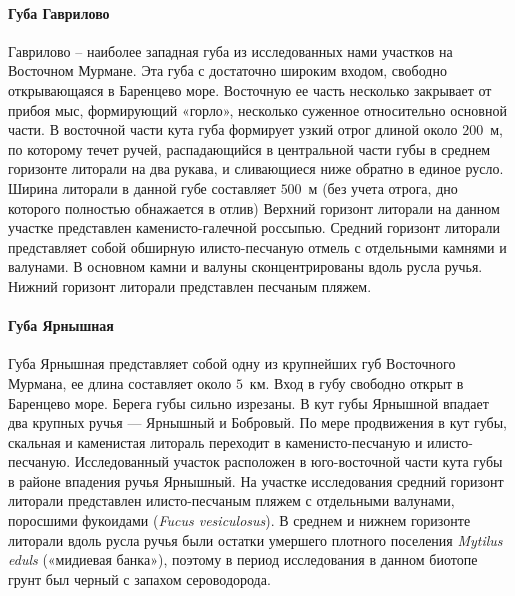     \paragraph{Губа Гаврилово}
Гаврилово – наиболее западная губа из исследованных нами участков на Восточном Мурмане. 
Эта   губа   с  достаточно   широким   входом,   свободно   открывающаяся  в  Баренцево море.   
Восточную   ее   часть   несколько   закрывает   от   прибоя   мыс,   формирующий   «горло», несколько суженное относительно основной части. 
В восточной части кута губа формирует узкий отрог длиной   около $200$~м, по которому течет ручей, распадающийся в центральной части   губы  в  среднем   горизонте   литорали   на   два   рукава,   и   сливающиеся   ниже   обратно   в единое русло.
Ширина литорали  в  данной губе составляет  $500$~м  (без  учета отрога, дно которого полностью обнажается в отлив) Верхний горизонт литорали на данном участке представлен каменисто-галечной   россыпью.   
Средний   горизонт   литорали   представляет   собой   обширную илисто-песчаную   отмель   с   отдельными   камнями   и   валунами.  
В   основном   камни   и   валуны сконцентрированы   вдоль   русла   ручья.   
Нижний   горизонт   литорали   представлен   песчаным пляжем. 

    \paragraph{Губа Ярнышная}
Губа Ярнышная представляет собой одну из крупнейших губ Восточного Мурмана, ее длина составляет около $5$~км. 
Вход в губу свободно открыт в Баренцево море. 
Берега губы сильно изрезаны. 
В кут губы Ярнышной впадает два крупных ручья --- Ярнышный и Бобровый. 
По мере продвижения в кут губы, скальная и каменистая литораль переходит в каменисто-песчаную и илисто-песчаную. 
Исследованный участок расположен в юго-восточной части кута губы в районе впадения ручья Ярнышный.
На   участке   исследования   средний   горизонт   литорали   представлен   илисто-песчаным пляжем   с   отдельными   валунами,   поросшими   фукоидами   ({\it Fucus   vesiculosus}).   
В   среднем   и нижнем горизонте литорали вдоль русла ручья были остатки умершего плотного поселения  {\it Mytilus eduls} («мидиевая банка»), поэтому в период исследования в данном биотопе грунт был черный с запахом сероводорода.


